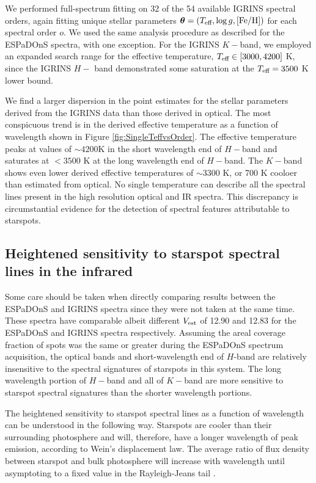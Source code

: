 \documentclass[twocolumn]{emulateapj}%
\begin{document}
We performed full-spectrum fitting on 32 of the 54 available IGRINS spectral orders, again fitting unique stellar parameters ${\bm \theta} = (T_\textrm{eff}, \log g, [{\rm Fe}/{\rm H}])$ for each spectral order $o$.  We used the same analysis procedure as described for the ESPaDOnS spectra, with one exception.  For the IGRINS $K-$band, we employed an expanded search range for the effective temperature, $T_\textrm{eff} \in [3000, 4200]$ K, since the IGRINS $H-$ band demonstrated some saturation at the $T_\textrm{eff}=3500$ K lower bound.  

We find a larger dispersion in the point estimates for the stellar parameters derived from the IGRINS data than those derived in optical.  The most conspicuous trend is in the derived effective temperature as a function of wavelength shown in Figure \ref{fig:SingleTeffvsOrder}.  The effective temperature peaks at values of $\sim4200$K in the short wavelength end of $H-$band and saturates at $<3500$ K at the long wavelength end of $H-$band.  The $K-$band shows even lower derived effective temperatures of $\sim3300$ K, or 700 K cooloer than estimated from optical.  No single temperature can describe all the spectral lines present in the high resolution optical and IR spectra.  This discrepancy is circumstantial evidence for the detection of spectral features attributable to starspots.  


\subsection{Heightened sensitivity to starspot spectral lines in the infrared}\label{sec:whyNearIR}

Some care should be taken when directly comparing results between the ESPaDOnS and IGRINS spectra since they were not taken at the same time.  These spectra have comparable albeit different $V_{\rm est}$ of 12.90 and 12.83 for the ESPaDOnS and IGRINS spectra respectively.  Assuming the areal coverage fraction of spots was the same or greater during the ESPaDOnS spectrum acquisition, the optical bands and short-wavelength end of $H$-band are relatively insensitive to the spectral signatures of starspots in this system.  The long wavelength portion of $H-$band and all of $K-$band are more sensitive to starspot spectral signatures than the shorter wavelength portions.

The heightened sensitivity to starspot spectral lines as a function of wavelength can be understood in the following way.  Starspots are cooler than their surrounding photosphere and will, therefore, have a longer wavelength of peak emission, according to Wein's displacement law.  The average ratio of flux density between starspot and bulk photosphere will increase with wavelength until asymptoting to a fixed value in the Rayleigh-Jeans tail \citep{wolk96}.
\end{document}
